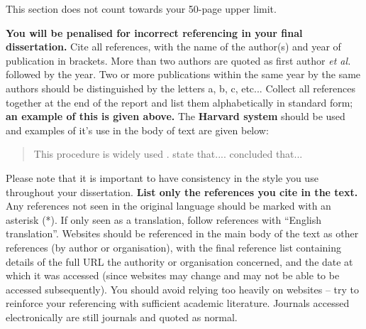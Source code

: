 \documentclass[a4paper,12pt]{article}
\begin{document}
This section does not count towards your 50-page upper limit.

\clearpage





\vspace*{10mm}

\textbf{You will be penalised for incorrect referencing in your final dissertation.} Cite all references, with the name of the author(s) and year of publication in brackets. More than
two authors are quoted as first author \textit{et al.} followed by the year.  Two or more publications within
the same year by the same authors should be distinguished by the letters a, b, c, etc... Collect all
references together at the end of the report and list them alphabetically in standard form; \textbf{an
example of this is given above.} The \textbf{Harvard system} should be used and examples of it’s use in the body of text are given below:


\begin{quote}
This procedure is widely used \citep{Christou2009,Wu2016,Hughes2016a,Hughes2016b}. \citet{Christou2014} state that.... \citet{Spinneken2009a,Spinneken2009b} concluded that...
\end{quote}


Please note that it is important to have consistency in the style you use throughout your dissertation. \textbf{List only the references you cite in the text.} Any references not seen in the original language should be marked with an asterisk (*). If only seen as a translation, follow references with ``English translation''. Websites should be referenced in the main body of the text as other references (by author or organisation), with the final reference list containing details of the full URL the authority or organisation concerned, and the date at which it was accessed (since websites may change and may not be able to be accessed subsequently). You should avoid relying too heavily on websites – try to reinforce your referencing with sufficient academic literature. Journals accessed electronically are still journals and quoted as normal.


\clearpage


\appendix
\end{document}
